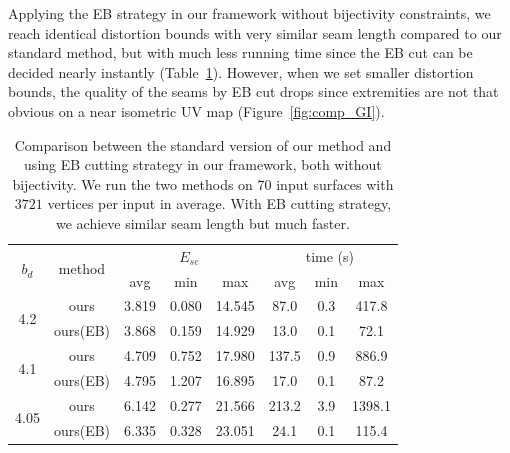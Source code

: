 Applying the EB strategy in our framework without bijectivity constraints, we reach identical distortion bounds with very similar seam length compared to our standard method, but with much less running time since the EB cut can be decided nearly instantly (Table~\ref{tb:comp_GI}). However, when we set smaller distortion bounds, the quality of the seams by EB cut drops since extremities are not that obvious on a near isometric UV map (Figure~\ref{fig:comp_GI}).

\begin{table}[!h]
\centering
\caption{Comparison between the standard version of our method and using EB cutting strategy in our framework, both without bijectivity. We run the two methods on 70 input surfaces with $3721$ vertices per input in average. With EB cutting strategy, we achieve similar seam length but much faster.} 
\label{tb:comp_GI}
\begin{tabular}{|c|c|ccc|ccc|}
\hline
\multirow{2}{*}{$b_d$} & \multirow{2}{*}{method} & \multicolumn{3}{c|}{$E_{se}$} & \multicolumn{3}{c|}{time (s)} \\ \cline{3-8} 
                       &                         & avg      & min     & max      & avg       & min    & max      \\ \hline
\multirow{2}{*}{4.2}   & ours                    & 3.819   & 0.080  & 14.545  & 87.0   & 0.3 & 417.8 \\
                       & ours(EB)                & 3.868   & 0.159  & 14.929  & 13.0   & 0.1 & 72.1  \\ \hline
\multirow{2}{*}{4.1}   & ours                    & 4.709   & 0.752  & 17.980  & 137.5  & 0.9 & 886.9 \\
                       & ours(EB)                & 4.795   & 1.207  & 16.895  & 17.0   & 0.1 & 87.2  \\ \hline
\multirow{2}{*}{4.05}  & ours                    & 6.142   & 0.277  & 21.566  & 213.2  & 3.9 & 1398.1   \\
                       & ours(EB)                & 6.335   & 0.328  & 23.051  & 24.1   & 0.1 & 115.4 \\ \hline
\end{tabular}
\end{table}

